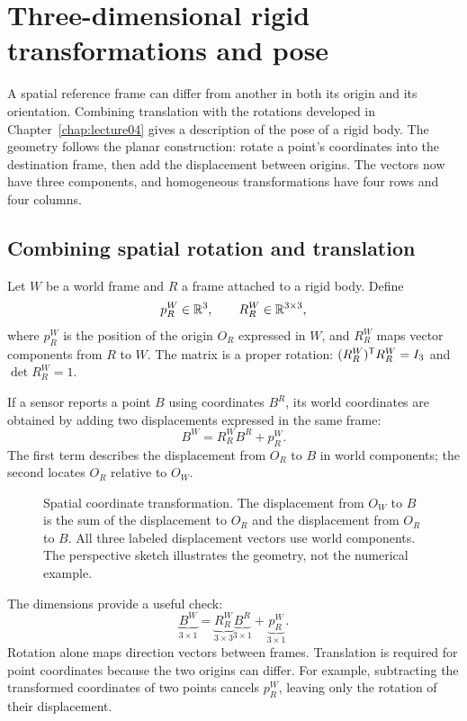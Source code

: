 \chapter{Three-dimensional rigid transformations and pose}
\label{chap:lecture05}

A spatial reference frame can differ from another in both its origin and its
orientation. Combining translation with the rotations developed in
Chapter~\ref{chap:lecture04} gives a description of the pose of a rigid body.
The geometry follows the planar construction: rotate a point's coordinates
into the destination frame, then add the displacement between origins.
The vectors now have three components, and homogeneous transformations have
four rows and four columns.

\section{Combining spatial rotation and translation}
Let $W$ be a world frame and $R$ a frame attached to a rigid body. Define
\[
 p_R^W\in\mathbb{R}^3,\qquad R_R^W\in\mathbb{R}^{3\times3},
\]
where $p_R^W$ is the position of the origin $O_R$ expressed in $W$, and
$R_R^W$ maps vector components from $R$ to $W$. The matrix is a proper
rotation: $(R_R^W)^{\mathsf T} R_R^W=I_3$ and $\det R_R^W=1$.

If a sensor reports a point $B$ using coordinates $B^R$, its world coordinates
are obtained by adding two displacements expressed in the same frame:
\begin{equation}
 \boxed{B^W=R_R^W B^R+p_R^W.}
 \label{eq:l05-affine}
\end{equation}
The first term describes the displacement from $O_R$ to $B$ in world
components; the second locates $O_R$ relative to $O_W$.

\begin{figure}[htbp]
\centering
\caption{Spatial coordinate transformation. The displacement from $O_W$ to
$B$ is the sum of the displacement to $O_R$ and the displacement from $O_R$
to $B$. All three labeled displacement vectors use world components.
The perspective sketch illustrates the geometry, not the numerical example.}
\label{fig:l05-geometry}
\end{figure}

The dimensions provide a useful check:
\[
 \underbrace{B^W}_{3\times1}
 =\underbrace{R_R^W}_{3\times3}\underbrace{B^R}_{3\times1}
 +\underbrace{p_R^W}_{3\times1}.
\]
Rotation alone maps direction vectors between frames. Translation is required
for point coordinates because the two origins can differ. For example,
subtracting the transformed coordinates of two points cancels $p_R^W$,
leaving only the rotation of their displacement.

